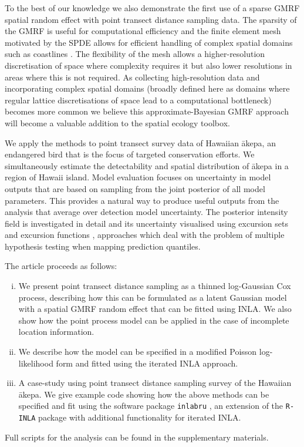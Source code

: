 \documentclass[preprint,12pt]{elsarticle}
\newcommand{\akepa}{\textquotesingle\={a}kepa}  %
\begin{document}
To the best of our knowledge we also demonstrate the first use of a sparse GMRF spatial random effect with point transect distance sampling data.  The sparsity of the GMRF is useful for computational efficiency and the finite element mesh motivated by the SPDE allows for efficient handling of complex spatial domains such as coastlines \citep{simpson_going_2016}. The flexibility of the mesh allows a higher-resolution discretisation of space where complexity requires it but also lower resolutions in areas where this is not required. As collecting high-resolution data and incorporating complex spatial domains (broadly defined here as domains where regular lattice discretisations of space lead to a computational bottleneck) becomes more common we believe this approximate-Bayesian GMRF approach will become a valuable addition to the spatial ecology toolbox. 


We apply the methods to point transect survey data of Hawaiian \akepa{}, an endangered bird that is the focus of targeted conservation efforts.  We simultaneously estimate the detectability and spatial distribution of \akepa{} in a region of Hawaii island.  Model evaluation focuses on uncertainty in model outputs that are based on sampling from the joint posterior of all model parameters.  This provides a natural way to produce useful outputs from the analysis that average over detection model uncertainty.  The posterior intensity field is investigated in detail and its uncertainty visualised using excursion sets and excursion functions \citep{bolin_excursion_2015, bolin_calculating_2018}, approaches which deal with the problem of multiple hypothesis testing when mapping prediction quantiles.  
 
The article proceeds as follows:
\begin{enumerate}[(i)]
\item We present point transect distance sampling as a thinned log-Gaussian Cox process, describing how this can be formulated as a latent Gaussian model with a spatial GMRF random effect that can be fitted using INLA.  We also show how the point process model can be applied in the case of incomplete location information. 
\item We describe how the model can be specified in a modified Poisson log-likelihood form and fitted using the iterated INLA approach.
\item A case-study using point transect distance sampling survey of the Hawaiian \akepa{}.  We give example code showing how the above methods can be specified and fit using the software package \texttt{inlabru} \citep{bachl_inlabru_2019}, an extension of the \texttt{R-INLA} package with additional functionality for iterated INLA.
\end{enumerate}
Full scripts for the analysis can be found in the supplementary materials.
\end{document}
